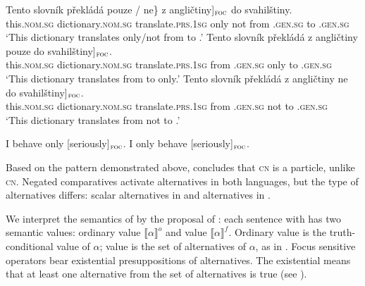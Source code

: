 \documentclass[output=paper, colorlinks, citecolor=brown, newtxmath]{langsci/langscibook}
\begin{document}
\ea \label{ex:only_c}
 \ea \gll Tento slovník překládá \minsp{\{} pouze / ne\} \minsp{[} z angličtiny]$_{\textsc{foc}}$ do svahilštiny.\\
    this.\textsc{nom.sg} dictionary.\textsc{nom.sg} translate.\textsc{prs.1sg} {} only {} not {} from .\textsc{gen.sg} to .\textsc{gen.sg}\\
    \glt `This dictionary translates only/not from  to .'
\ex
    \gll Tento slovník překládá z angličtiny pouze \minsp{[} do svahilštiny]$_{\textsc{foc}}$.\\
    this.\textsc{nom.sg} dictionary.\textsc{nom.sg} translate.\textsc{prs.1sg} from .\textsc{gen.sg} only {} to .\textsc{gen.sg}\\
    \glt `This dictionary translates from  to  only.' \label{ex:only_c_2}
\ex
    \gll Tento slovník překládá z angličtiny ne \minsp{[} do svahilštiny]$_{\textsc{foc}}$.\\
    this.\textsc{nom.sg} dictionary.\textsc{nom.sg} translate.\textsc{prs.1sg} from .\textsc{gen.sg} not {} to .\textsc{gen.sg}\\
    \glt `This dictionary translates from  not to .' \label{ex:only_c_3}
\z
\z


\ea \label{ex:only_e}
	\ea I behave only [seriously]$_{\textsc{foc}}$.
    \ex I only behave [seriously]$_{\textsc{foc}}$.\hfill\citep{dovcekal2017upper}
\z
\z


\noindent Based on the pattern demonstrated above, \cite{dovcekal2017upper} concludes that  \textsc{cn} is a  particle, unlike  \textsc{cn}. Negated comparatives activate alternatives in both languages, but the type of alternatives differs: scalar alternatives in  \citep{nouwen2008upper} and  alternatives in  \citep{dovcekal2017upper}.

We interpret the semantics of  by the proposal of \cite{rooth1985association,rooth1992theory}: each sentence with  has two semantic values: ordinary value $\llbracket \alpha
 \rrbracket^{o}$ and  value $\llbracket \alpha \rrbracket^{f}$. Ordinary value is the truth-conditional value of $\alpha$;  value is the set of alternatives of $\alpha$, as in . Focus sensitive operators bear existential presuppositions of  alternatives. The existential  means that at least one alternative from the set of alternatives is true (see \citealt{rooth1985association,rooth1992theory}).
\end{document}
